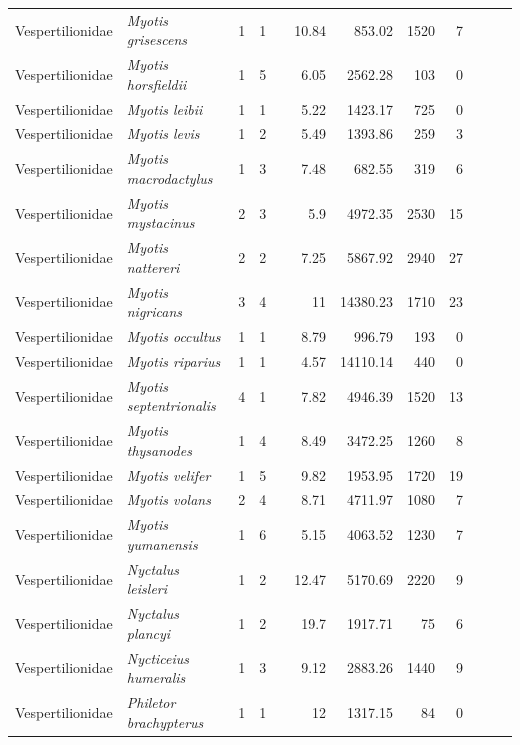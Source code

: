 \begin{landscape}
\begin{longtable}{@{}llrrrrrrrrrl@{}}
  Vespertilionidae & \emph{Myotis grisescens} & 1 & 1 &  & 10.84 & 853.02 & 1520 & 7 &  &  &  \\ 
  Vespertilionidae & \emph{Myotis horsfieldii} & 1 & 5 &  & 6.05 & 2562.28 & 103 & 0 &  &  &  \\ 
  Vespertilionidae & \emph{Myotis leibii} & 1 & 1 &  & 5.22 & 1423.17 & 725 & 0 &  &  &  \\ 
  Vespertilionidae & \emph{Myotis levis} & 1 & 2 &  & 5.49 & 1393.86 & 259 & 3 &  &  &  \\ 
  Vespertilionidae & \emph{Myotis macrodactylus} & 1 & 3 &  & 7.48 & 682.55 & 319 & 6 &  &  &  \\ 
  Vespertilionidae & \emph{Myotis mystacinus} & 2 & 3 &  & 5.9 & 4972.35 & 2530 & 15 &  &  &  \\ 
  Vespertilionidae & \emph{Myotis nattereri} & 2 & 2 &  & 7.25 & 5867.92 & 2940 & 27 &  &  &  \\ 
  Vespertilionidae & \emph{Myotis nigricans} & 3 & 4 &  & 11 & 14380.23 & 1710 & 23 &  &  &  \\ 
  Vespertilionidae & \emph{Myotis occultus} & 1 & 1 &  & 8.79 & 996.79 & 193 & 0 &  &  &  \\ 
  Vespertilionidae & \emph{Myotis riparius} & 1 & 1 &  & 4.57 & 14110.14 & 440 & 0 &  &  &  \\ 
  Vespertilionidae & \emph{Myotis septentrionalis} & 4 & 1 &  & 7.82 & 4946.39 & 1520 & 13 &  &  &  \\ 
  Vespertilionidae & \emph{Myotis thysanodes} & 1 & 4 &  & 8.49 & 3472.25 & 1260 & 8 &  &  &  \\ 
  Vespertilionidae & \emph{Myotis velifer} & 1 & 5 &  & 9.82 & 1953.95 & 1720 & 19 &  &  &  \\ 
  Vespertilionidae & \emph{Myotis volans} & 2 & 4 &  & 8.71 & 4711.97 & 1080 & 7 &  &  &  \\ 
  Vespertilionidae & \emph{Myotis yumanensis} & 1 & 6 &  & 5.15 & 4063.52 & 1230 & 7 &  &  &  \\ 
  Vespertilionidae & \emph{Nyctalus leisleri} & 1 & 2 &  & 12.47 & 5170.69 & 2220 & 9 &  &  &  \\ 
  Vespertilionidae & \emph{Nyctalus plancyi} & 1 & 2 &  & 19.7 & 1917.71 & 75 & 6 &  &  &  \\ 
  Vespertilionidae & \emph{Nycticeius humeralis} & 1 & 3 &  & 9.12 & 2883.26 & 1440 & 9 &  &  &  \\ 
  Vespertilionidae & \emph{Philetor brachypterus} & 1 & 1 &  & 12 & 1317.15 & 84 & 0 &  &  &  \\ 

\end{longtable}
\end{landscape}
